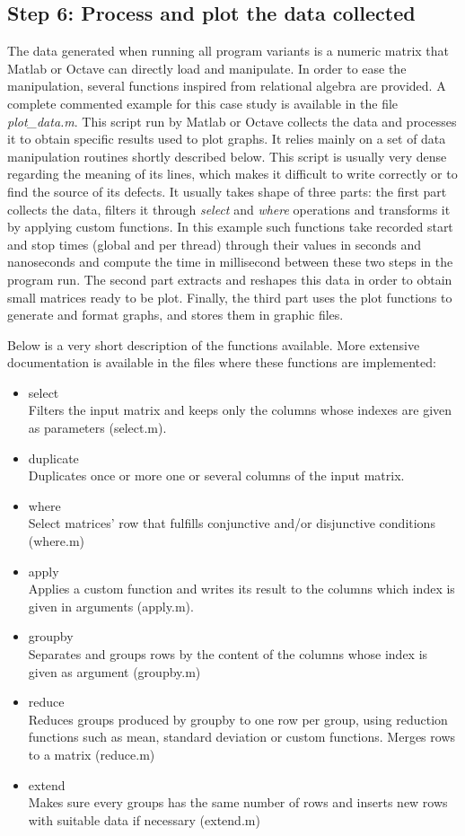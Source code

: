 \subsection{Step 6: Process and plot the data collected}
\label{sec:format}
The data generated when running all program variants is a numeric matrix that Matlab or Octave can directly load and manipulate. In order to ease the manipulation, several functions inspired from relational algebra are provided. A complete commented example for this case study is available in the file \emph{plot\_data.m}. This script run by Matlab or Octave collects the data and processes it to obtain specific results used to plot graphs. It relies mainly on a set of data manipulation routines shortly described below. This script is usually very dense regarding the meaning of its lines, which makes it difficult to write correctly or to find the source of its defects. It usually takes shape of three parts: the first part collects the data, filters it through \emph{select} and \emph{where} operations and transforms it by applying custom functions. In this example such functions take recorded start and stop times (global and per thread) through their values in seconds and nanoseconds and compute the time in millisecond between these two steps in the program run. The second part extracts and reshapes this data in order to obtain small matrices ready to be plot. Finally, the third part uses the plot functions to generate and format graphs, and stores them in graphic files.

Below is a very short description of the functions available. More extensive documentation is available in the files where these functions are implemented:
\begin{itemize}
\item select\\
Filters the input matrix and keeps only the columns whose indexes are given as parameters (select.m).
\item duplicate\\ 
Duplicates once or more one or several columns of the input matrix.
\item where\\
Select matrices' row that fulfills conjunctive and/or disjunctive conditions (where.m)
\item apply\\
Applies a custom function and writes its result to the columns which index is given in arguments (apply.m).
\item groupby\\
Separates and groups rows by the content of the columns whose index is given as argument (groupby.m)
\item reduce\\
Reduces groups produced by groupby to one row per group, using reduction functions such as mean, standard deviation or custom functions. Merges rows to a matrix (reduce.m)
\item extend\\
Makes sure every groups has the same number of rows and inserts new rows with suitable data if necessary (extend.m)
\end{itemize}

